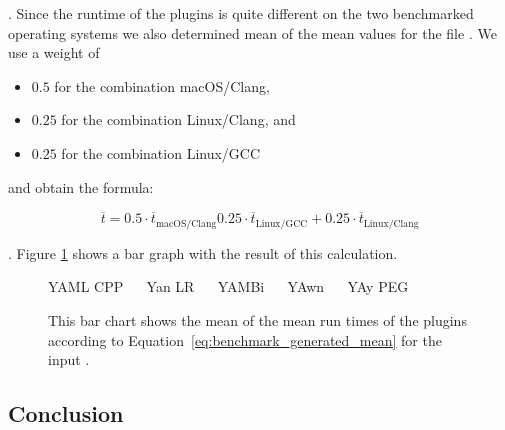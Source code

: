 . Since the runtime of the plugins is quite different on the two benchmarked operating systems we also determined mean of the mean values for the file \FileGenerated{}. We use a weight of

\begin{itemize}
  \item $0.5$ for the combination macOS/Clang,
  \item $0.25$ for the combination Linux/Clang, and
  \item $0.25$ for the combination Linux/GCC
\end{itemize}

and obtain the formula:

\begin{equation}
  \overline{t} = 0.5  · \overline{t}_{\text{macOS/Clang}}
                 0.25 · \overline{t}_{\text{Linux/GCC}} +
                 0.25 · \overline{t}_{\text{Linux/Clang}}
  \label{eq:benchmark_generated_mean}
\end{equation}

. Figure \ref{fig:benchmark_generated_mean} shows a bar graph with the result of this calculation.

\begin{figure}[H]
  \begin{bchart}[max=300, width=0.8\textwidth, unit=ms]





  \end{bchart}
  \begin{center}
  \vspace{-0.5cm}
     YAML CPP ~~
     Yan LR ~~
     YAMBi ~~
     YAwn ~~
     YAy PEG
  \vspace{-0.5cm}
  \end{center}
  \caption{This bar chart shows the mean of the mean run times of the plugins according to Equation~\ref{eq:benchmark_generated_mean} for the input \FileGenerated{}.}
  \label{fig:benchmark_generated_mean}
\end{figure}

\subsection{Conclusion}

